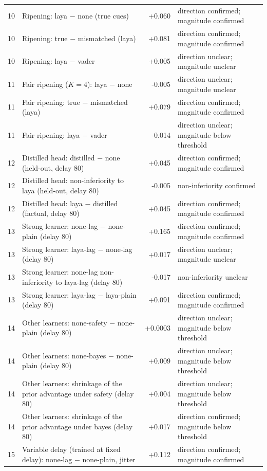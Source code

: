 \begin{table}[t]
\begin{tabular}{@{}lp{}rp{}@{}}
10 & Ripening: laya $-$ none (true cues) & +0.060 & direction confirmed; magnitude confirmed \\
10 & Ripening: true $-$ mismatched (laya) & +0.081 & direction confirmed; magnitude confirmed \\
10 & Ripening: laya $-$ vader & +0.005 & direction unclear; magnitude unclear \\
11 & Fair ripening ($K{=}4$): laya $-$ none & -0.005 & direction unclear; magnitude unclear \\
11 & Fair ripening: true $-$ mismatched (laya) & +0.079 & direction confirmed; magnitude confirmed \\
11 & Fair ripening: laya $-$ vader & -0.014 & direction unclear; magnitude below threshold \\
12 & Distilled head: distilled $-$ none (held-out, delay 80) & +0.045 & direction confirmed; magnitude confirmed \\
12 & Distilled head: non-inferiority to laya (held-out, delay 80) & -0.005 & non-inferiority confirmed \\
12 & Distilled head: laya $-$ distilled (factual, delay 80) & +0.045 & direction confirmed; magnitude confirmed \\
13 & Strong learner: none-lag $-$ none-plain (delay 80) & +0.165 & direction confirmed; magnitude confirmed \\
13 & Strong learner: laya-lag $-$ none-lag (delay 80) & +0.017 & direction unclear; magnitude unclear \\
13 & Strong learner: none-lag non-inferiority to laya-lag (delay 80) & -0.017 & non-inferiority unclear \\
13 & Strong learner: laya-lag $-$ laya-plain (delay 80) & +0.091 & direction confirmed; magnitude confirmed \\
14 & Other learners: none-safety $-$ none-plain (delay 80) & +0.0003 & direction unclear; magnitude below threshold \\
14 & Other learners: none-bayes $-$ none-plain (delay 80) & +0.009 & direction unclear; magnitude below threshold \\
14 & Other learners: shrinkage of the prior advantage under safety (delay 80) & +0.004 & direction unclear; magnitude below threshold \\
14 & Other learners: shrinkage of the prior advantage under bayes (delay 80) & +0.017 & direction confirmed; magnitude below threshold \\
15 & Variable delay (trained at fixed delay): none-lag $-$ none-plain, jitter & +0.112 & direction confirmed; magnitude confirmed \\

\end{tabular}
\end{table}
